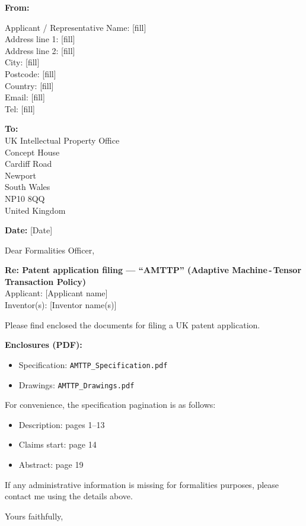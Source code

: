 \documentclass[12pt]{article}
\begin{document}
\noindent\textbf{From:}\par
\noindent Applicant / Representative Name: [fill]\\
\noindent Address line 1: [fill]\\
\noindent Address line 2: [fill]\\
\noindent City: [fill]\\
\noindent Postcode: [fill]\\
\noindent Country: [fill]\\
\noindent Email: [fill]\\
\noindent Tel: [fill]

\vspace{1em}

\noindent\textbf{To:}\\
UK Intellectual Property Office\\
Concept House\\
Cardiff Road\\
Newport\\
South Wales\\
NP10 8QQ\\
United Kingdom

\vspace{1em}

\noindent\textbf{Date:} [Date]

\vspace{1em}

\noindent Dear Formalities Officer,

\vspace{0.8em}

\noindent\textbf{Re: Patent application filing --- ``AMTTP'' (Adaptive Machine\,-\,Tensor Transaction Policy)}\\
Applicant: [Applicant name]\\
Inventor(s): [Inventor name(s)]

\vspace{0.8em}

\noindent Please find enclosed the documents for filing a UK patent application.

\vspace{0.6em}

\noindent\textbf{Enclosures (PDF):}
\begin{itemize}
  \item Specification: \texttt{AMTTP\_Specification.pdf}
  \item Drawings: \texttt{AMTTP\_Drawings.pdf}
\end{itemize}

\noindent For convenience, the specification pagination is as follows:
\begin{itemize}
  \item Description: pages 1--13
  \item Claims start: page 14
  \item Abstract: page 19
\end{itemize}

\noindent If any administrative information is missing for formalities purposes, please contact me using the details above.

\vspace{1em}

\noindent Yours faithfully,\\
[Name]
\end{document}
